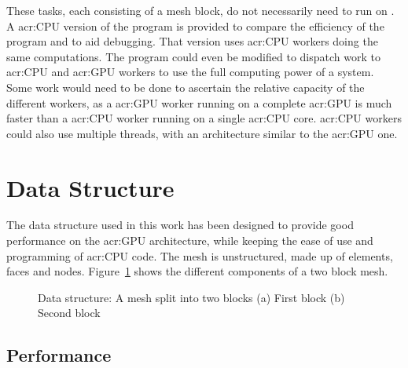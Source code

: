 These tasks, each consisting of a mesh block, do not necessarily need to run on
. A \acrshort{acr:CPU} version of the program is provided to compare the
efficiency of the program and to aid debugging. That version uses \acrshort{acr:CPU} workers doing
the same computations. The program could even be modified to dispatch work to \acrshort{acr:CPU} and
\acrshort{acr:GPU} workers to use the full computing power of a system. Some work would need to be
done to ascertain the relative capacity of the different workers, as a \acrshort{acr:GPU} worker
running on a complete \acrshort{acr:GPU} is much faster than a \acrshort{acr:CPU} worker running on
a single \acrshort{acr:CPU} core. \Acrshort{acr:CPU} workers could also use multiple threads, with
an architecture similar to the \acrshort{acr:GPU} one.

\section{Data Structure}\label{section:graphics_processing_units:data_structure}

The data structure used in this work has been designed to provide good performance on the
\acrshort{acr:GPU} architecture, while keeping the ease of use and programming of \acrshort{acr:CPU}
code. The mesh is unstructured, made up of elements, faces and nodes.
Figure~\ref{fig:mesh_structure} shows the different components of a two block mesh.

\begin{figure}[H]
	\centering
	\hfill
	\caption{Data structure: A mesh split into two blocks (a) First block (b) Second block}\label{fig:mesh_structure}
\end{figure}

\subsection{Performance}\label{subsection:graphics_processing_units:data_structure:performance}

